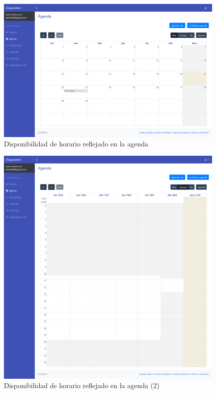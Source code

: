 \begin{figure}[H]
\centering
\includegraphics[width=17cm,keepaspectratio]{pictures/adminodo/citas/agenda-3.png}
\caption{Disponibilidad de horario reflejado en la agenda}
\end{figure}

\begin{figure}[H]
\centering
\includegraphics[width=17cm,keepaspectratio]{pictures/adminodo/citas/agenda-4.png}
\caption{Disponibilidad de horario reflejado en la agenda (2) }
\end{figure}



